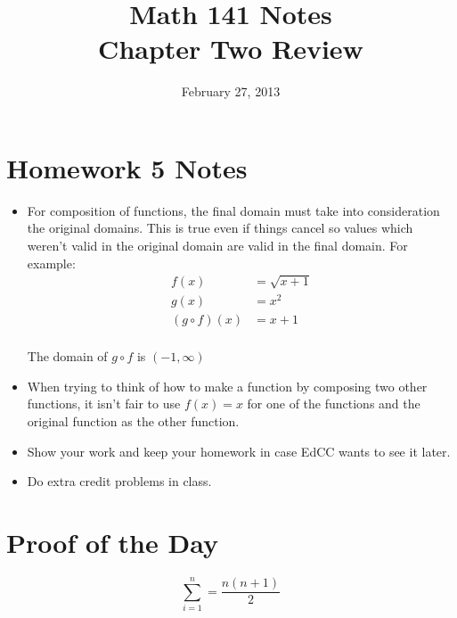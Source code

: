 \documentclass{exam}
\title{Math 141 Notes \\ Chapter Two Review}
\date{February 27, 2013}
\begin{document}
\maketitle
\tableofcontents

\section{Homework 5 Notes}
\begin{itemize}
  \item For composition of functions, the final domain must take into consideration the original domains.  This is true
    even if things cancel so values which weren't valid in the original domain are valid in the final domain.  For
    example:
    \begin{align*}
      f(x) &= \sqrt{x + 1} \\
      g(x) &= x^2 \\
      (g \circ f)(x) &= x + 1 \\
    \end{align*}

    The domain of $g \circ f$ is $(-1, \infty)$

  \item When trying to think of how to make a function by composing two other functions, it isn't fair to use $f(x) = x$
    for one of the functions and the original function as the other function.

  \item Show your work and keep your homework in case EdCC wants to see it later.

  \item Do extra credit problems in class.

\end{itemize}

\section{Proof of the Day}
\[
  \sum_{i = 1}^n = \frac{n(n + 1)}{2}
\]
\end{document}
